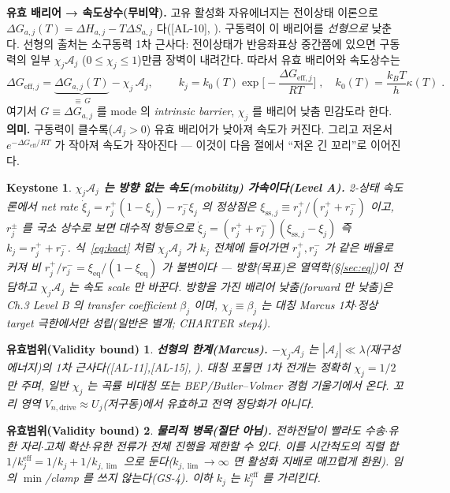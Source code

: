 \documentclass[11pt,a4paper]{article}
\newtheorem*{boundbox}{유효범위(Validity bound)}
\newtheorem*{keybox}{Keystone}
\newcommand{\eff}{\mathrm{eff}}
\newcommand{\eq}{\mathrm{eq}}
\newcommand{\drive}{\mathrm{drive}}
\newcommand{\sstat}{\mathrm{ss}}
\newcommand{\AL}[1]{\textsf{[AL-#1]}}
\begin{document}
\textbf{유효 배리어 → 속도상수(무비약).} 고유 활성화 자유에너지는 전이상태 이론으로 $\Delta G_{a,j}(T)=\Delta
H_{a,j}-T\Delta S_{a,j}$ 다(\AL{10}, \cite{eyring1935}). 구동력이 이 배리어를 \emph{선형으로} 낮춘다. 선형의
출처는 소구동력 1차 근사다: 전이상태가 반응좌표상 중간쯤에 있으면 구동력의 일부 $\chi_j\mathcal A_j$
($0\le\chi_j\le1$)만큼 장벽이 내려간다. 따라서 유효 배리어와 속도상수는
\begin{equation}
\Delta G_{\eff,j}=\underbrace{\Delta G_{a,j}(T)}_{\equiv\,G}-\chi_j\,\mathcal A_j,
\qquad
\boxed{\;k_j=k_0(T)\exp\!\Big[-\frac{\Delta G_{\eff,j}}{RT}\Big]\;,\quad k_0(T)=\frac{k_BT}{h}\kappa(T)\;.}
\label{eq:kact}
\end{equation}
여기서 $G\equiv\Delta G_{a,j}$ 를 mode 의 \emph{intrinsic barrier}, $\chi_j$ 를 배리어 낮춤 민감도라 한다.
\textbf{의미.} 구동력이 클수록($\mathcal A_j>0$) 유효 배리어가 낮아져 속도가 커진다. 그리고 저온서
$e^{-\Delta G_{\eff}/RT}$ 가 작아져 속도가 작아진다 — 이것이 다음 절에서 ``저온 긴 꼬리''로 이어진다.

\begin{keybox}
\textbf{$\chi_j\mathcal A_j$ 는 방향 \emph{없는} 속도(mobility) 가속이다(Level A).} 2-상태 속도론에서 net
rate $\dot\xi_j=r_j^+(1-\xi_j)-r_j^-\xi_j$ 의 정상점은 $\xi_{\sstat,j}\equiv r_j^+/(r_j^++r_j^-)$ 이고,
$r_j^\pm$ 를 국소 상수로 보면 대수적 항등으로 $\dot\xi_j=(r_j^++r_j^-)(\xi_{\sstat,j}-\xi_j)$ 즉
$k_j=r_j^++r_j^-$. 식~\eqref{eq:kact} 처럼 $\chi_j\mathcal A_j$ 가 $k_j$ \emph{전체}에 들어가면 $r_j^+,r_j^-$
가 같은 배율로 커져 비 $r_j^+/r_j^-=\xi_\eq/(1-\xi_\eq)$ 가 불변이다 — 방향(목표)은 열역학(\S\ref{sec:eq})이
전담하고 $\chi_j\mathcal A_j$ 는 속도 scale 만 바꾼다. \emph{방향을 가진} 배리어 낮춤(forward 만 낮춤)은
Ch.3 Level B 의 transfer coefficient $\beta_j$ 이며, $\chi_j\equiv\beta_j$ 는 \emph{대칭 Marcus 1차$\cdot$정상
target 극한}에서만 성립(일반은 별개; CHARTER step4).
\end{keybox}
\begin{boundbox}
\textbf{선형의 한계(Marcus).} $-\chi_j\mathcal A_j$ 는 $|\mathcal A_j|\ll\lambda$(재구성 에너지)의 1차
근사다(\AL{11},\AL{15}, \cite{marcus1956}). 대칭 포물면 1차 전개는 정확히 $\chi_j=1/2$ 만 주며, 일반
$\chi_j$ 는 곡률 비대칭 또는 BEP/Butler--Volmer 경험 기울기에서 온다. 꼬리 영역
$V_{n,\drive}\approx U_j$(저구동)에서 유효하고 전역 정당화가 아니다.
\end{boundbox}
\begin{boundbox}
\textbf{물리적 병목(절단 아님).} 전하전달이 빨라도 수송$\cdot$유한 자리$\cdot$고체 확산$\cdot$유한 전류가 전체
진행을 제한할 수 있다. 이를 시간척도의 직렬 합 $1/k_j^{\eff}=1/k_j+1/k_{j,\lim}$ 으로 둔다($k_{j,\lim}\to
\infty$ 면 활성화 지배로 매끄럽게 환원). 임의 $\min$/clamp 를 쓰지 않는다(GS-4). 이하 $k_j$ 는 $k_j^{\eff}$
를 가리킨다.
\end{boundbox}
\end{document}
